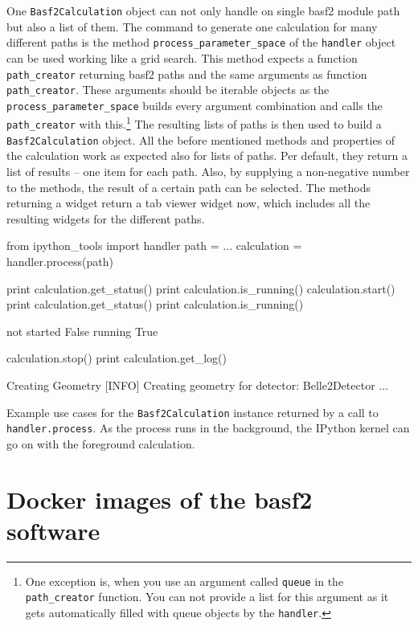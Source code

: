 One \texttt{Basf2Calculation} object can not only handle on single basf2 module path but also a list of them. The command to generate one calculation for many different paths is the method \verb+process_parameter_space+ of the \texttt{handler} object can be used working like a grid search. This method expects a function \verb+path_creator+ returning basf2 paths and the same arguments as function \verb+path_creator+. These arguments should be iterable objects as the \verb+process_parameter_space+ builds every argument combination and calls the \verb+path_creator+ with this.\footnote{One exception is, when you use an argument called \texttt{queue} in the \texttt{path\_creator} function. You can not provide a list for this argument as it gets automatically filled with queue objects by the \texttt{handler}.} The resulting lists of paths is then used to build a \texttt{Basf2Calculation} object. All the before mentioned methods and properties of the calculation work as expected also for lists of paths. Per default, they return a list of results -- one item for each path. Also, by supplying a non-negative number to the methods, the result of a certain path can be selected. The methods returning a widget return a tab viewer widget now, which includes all the resulting widgets for the different paths.

\begin{listing}
\begin{inputipynb}
from ipython_tools import handler
path = ...
calculation = handler.process(path)
\end{inputipynb}
\begin{inputipynb}
print calculation.get_status()
print calculation.is_running()
calculation.start()
print calculation.get_status()
print calculation.is_running()
\end{inputipynb}
\begin{outputipynb}
not started
False
running
True
\end{outputipynb}
\begin{inputipynb}
calculation.stop()
print calculation.get_log()
\end{inputipynb}
\begin{outputipynb}[\theipythcntr]
[INFO] Creating Geometry
[INFO] Creating geometry for detector: Belle2Detector
...
\end{outputipynb}

  \caption[Example use cases for the Basf2Calculation objects.]{Example use cases for the \texttt{Basf2Calculation} instance returned by a call to \texttt{handler.process}. As the process runs in the background, the IPython kernel can go on with the foreground calculation.}
  \label{lis-calculation}
\end{listing}

\section{Docker images of the basf2 software}
